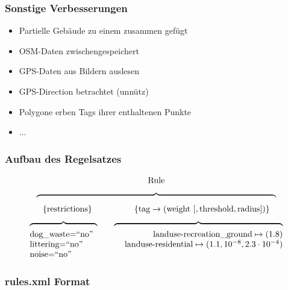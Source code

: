 \begin{frame}
  \frametitle{Sonstige Verbesserungen}
  \begin{itemize}
    \item Partielle Gebäude zu einem zusammen gefügt
    \item OSM-Daten zwischengespeichert
    \item GPS-Daten aus Bildern auslesen
    \item GPS-Direction betrachtet (unnütz)
    \item Polygone erben Tags ihrer enthaltenen Punkte
    \item ...
  \end{itemize}
\end{frame}

\begin{frame}[fragile]
 \frametitle{Aufbau des Regelsatzes}
 \[
  \begin{array}{c}
  \text{Rule} \\[6pt]
  \overbrace{\hspace{284pt}}\\[4pt]
    \{ \text{restrictions} \}
    \hspace{50pt}
    \{ \text{tag} \to (\text{weight}~[,\text{threshold},\text{radius}]) \} \\[6pt]
    \begin{array}{l r}
      \overbrace{ \hspace{80pt} } \hspace{10pt} & \overbrace{ \hspace{200pt} }\\
      \text{dog\_waste=``no''} & \text{landuse-recreation\_ground} \mapsto (1.8) \\
      \text{littering=``no''} & \text{landuse-residential} \mapsto (1.1,10^{-8},2.3\cdot 10^{-4}) \\
      \text{noise=``no''} & 
    \end{array}
  \end{array}
 \]
\end{frame}

\begin{frame}[fragile]
  \frametitle{rules.xml Format}
  \lstset{language=XML,basicstyle=\scriptsize}
  
\end{frame}
